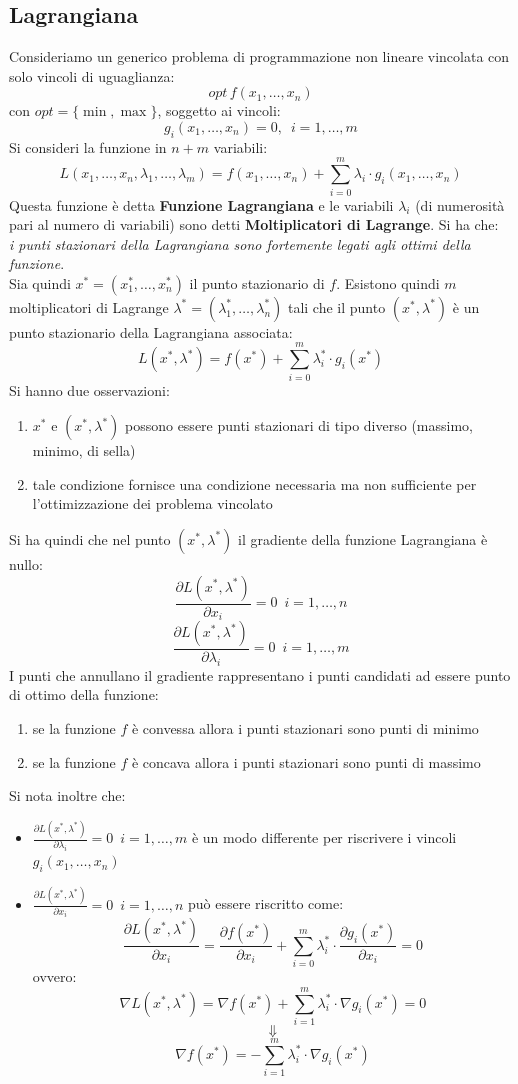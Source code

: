 \documentclass[a4paper,12pt, oneside]{book}
\begin{document}
\subsection{Lagrangiana}
Consideriamo un generico problema di programmazione non lineare
vincolata con solo vincoli di uguaglianza:
\[opt\,f(x_1,\ldots,x_n)\]
con $opt=\{\min,\max\}$, soggetto ai vincoli:
\[g_i(x_1,\ldots,x_n)=0,\,\,\,i=1,\ldots,m\]
Si consideri la funzione in $n+m$ variabili:
\[L(x_1,\ldots,x_n,\lambda_1,\ldots,\lambda_m)=f(x_1,\ldots,x_n)+
  \sum_{i=0}^m\lambda_i\cdot g_i(x_1,\ldots,x_n)\]
Questa funzione è detta \textbf{Funzione Lagrangiana} e le variabili
$\lambda_i$ (di numerosità pari al numero di variabili) sono detti
\textbf{Moltiplicatori di Lagrange}. Si ha che:\\
\textit{i punti stazionari della Lagrangiana sono fortemente legati
  agli ottimi della funzione}.\\
Sia quindi $x^*=(x_1^*,\ldots,x_n^*)$ il punto stazionario di
$f$. Esistono quindi $m$ moltiplicatori di Lagrange
$\lambda^*=(\lambda_1^*,\ldots, \lambda_n^*)$ tali che il punto
$(x^*,\lambda^*)$ è un punto stazionario della Lagrangiana associata:
\[L(x^*,\lambda^*)=f(x^*)+\sum_{i=0}^m\lambda_i^*\cdot g_i(x^*)\]
Si hanno due osservazioni:
\begin{enumerate}
  \item $x^*$ e $(x^*,\lambda^*)$ possono essere punti stazionari di
  tipo diverso (massimo, minimo, di sella)
  \item tale condizione fornisce una condizione necessaria ma non
  sufficiente per l’ottimizzazione dei problema vincolato 
\end{enumerate}
Si ha quindi che nel punto $(x^*,\lambda^*)$ il gradiente della
funzione Lagrangiana è nullo:
\[\frac{\partial L(x^*,\lambda^*)}{\partial
    x_i}=0\,\,\,i=1,\ldots,n\]
\[\frac{\partial L(x^*,\lambda^*)}{\partial
    \lambda_i}=0\,\,\,i=1,\ldots,m\]
I punti che annullano il gradiente rappresentano i punti candidati ad
essere punto di ottimo della funzione:
\begin{enumerate}
  \item se la funzione $f$ è convessa allora i punti stazionari sono
  punti di minimo
  \item se la funzione $f$ è concava allora i punti stazionari sono
  punti di massimo 
\end{enumerate}
Si nota inoltre che:
\begin{itemize}
  \item $\frac{\partial L(x^*,\lambda^*)}{\partial
    \lambda_i}=0\,\,\,i=1,\ldots,m$ è un modo differente per
  riscrivere i vincoli $g_i(x_1,\ldots,x_n)$
  \item  $\frac{\partial L(x^*,\lambda^*)}{\partial
    x_i}=0\,\,\,i=1,\ldots,n$ può essere riscritto come:
  \[\frac{\partial L(x^*,\lambda^*)}{\partial
      x_i}=\frac{\partial f(x^*)}{\partial
      x_i}+\sum_{i=0}^m\lambda_i^*\cdot \frac{\partial
      g_i(x^*)}{\partial x_i}=0\]
  \newpage
  ovvero:
  \[\nabla L(x^*,\lambda^*)=\nabla
    f(x^*)+\sum_{i=1}^m\lambda_i^*\cdot \nabla g_i(x^*)=0\]
  \[\Downarrow\]
  \[\nabla f(x^*)=-\sum_{i=1}^m\lambda_i^*\cdot \nabla g_i(x^*)\]
\end{itemize}
\end{document}
